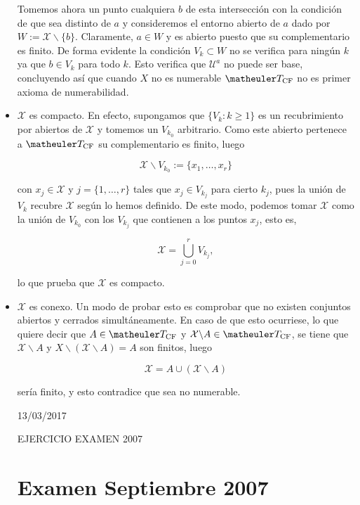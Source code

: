 \begin{itemize}
Tomemos ahora un punto cualquiera $b$ de esta intersección con la condición de que sea distinto de $a$ y consideremos el entorno abierto de $a$ dado por $W:=\mathcal{X}\backslash \{b\}$. Claramente, $a\in W$ y es abierto puesto que su complementario es finito.  De forma evidente la condición $V_k \subset W$ no se verifica para ningún $k$ ya que $b\in V_k$ para todo $k$. Esto verifica que $\mathcal{U}^a$ no puede ser base, concluyendo así que cuando $X$ no es numerable $\T_{\text{CF}}$ no es primer axioma de numerabilidad.

\item $\mathcal{X}$ es compacto. En efecto, supongamos que $\{V_k : k \geq 1\}$ es un recubrimiento por abiertos de $\mathcal{X}$ y tomemos un $V_{k_0}$ arbitrario. Como este abierto pertenece a $\T_{\text{CF}}$ su complementario es finito, luego 

\[\mathcal{X} \backslash V_{k_0} := \{x_1, \ldots, x_r\}\]

con $x_j \in \mathcal{X}$ y $j=\{1,\ldots, r\}$ tales que $x_j\in V_{k_j}$ para cierto $k_j$, pues la unión de $V_k$ recubre $\mathcal{X}$ según lo hemos definido. De este modo, podemos tomar $\mathcal{X}$ como la unión de $V_{k_0}$ con los $V_{k_j}$ que contienen a los puntos $x_j$, esto es,

\[\mathcal{X}=\bigcup_{j=0}^r V_{k_j},\]

lo que prueba que $\mathcal{X}$ es compacto. 

\item $\mathcal{X}$ es conexo. Un modo de probar esto es comprobar que no existen conjuntos abiertos y cerrados simultáneamente. En caso de que esto ocurriese, lo que quiere decir que $A\in \T_{\text{CF}}$ y $\mathcal{X}\backslash A \in \T_{\text{CF}}$, se tiene que $\mathcal{X} \backslash A$ y $X\backslash (\mathcal{X}\backslash A)=A$ son finitos, luego

\[\mathcal{X}=A \cup (\mathcal{X}\backslash A)\]

sería finito, y esto contradice que sea no numerable. 



13/03/2017

EJERCICIO EXAMEN 2007

\section{Examen Septiembre 2007}

\end{itemize}
